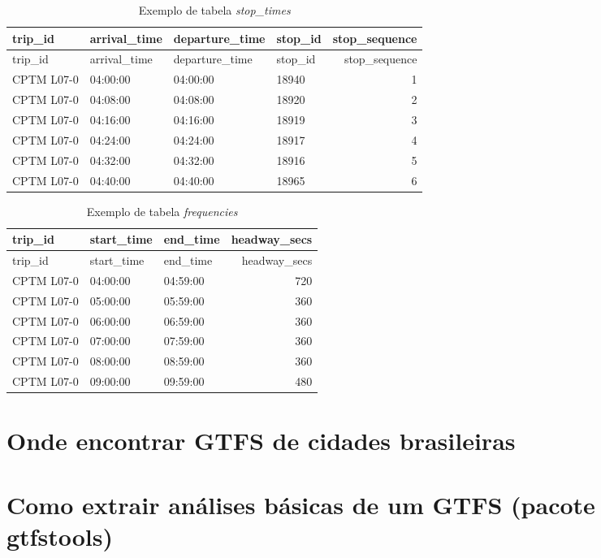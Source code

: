 \documentclass[
  letterpaper,
  DIV=11,
  numbers=noendperiod]{scrreprt}
\begin{document}
\hypertarget{tbl-stop_times}{}
\begin{longtable}[]{@{}llllr@{}}
\caption{\label{tbl-stop_times}Exemplo de tabela
\emph{stop\_times}}\tabularnewline
\toprule()
trip\_id & arrival\_time & departure\_time & stop\_id &
stop\_sequence \\
\midrule()
\endfirsthead
\toprule()
trip\_id & arrival\_time & departure\_time & stop\_id &
stop\_sequence \\
\midrule()
\endhead
CPTM L07-0 & 04:00:00 & 04:00:00 & 18940 & 1 \\
CPTM L07-0 & 04:08:00 & 04:08:00 & 18920 & 2 \\
CPTM L07-0 & 04:16:00 & 04:16:00 & 18919 & 3 \\
CPTM L07-0 & 04:24:00 & 04:24:00 & 18917 & 4 \\
CPTM L07-0 & 04:32:00 & 04:32:00 & 18916 & 5 \\
CPTM L07-0 & 04:40:00 & 04:40:00 & 18965 & 6 \\
\bottomrule()
\end{longtable}

\hypertarget{tbl-frequencies}{}
\begin{longtable}[]{@{}lllr@{}}
\caption{\label{tbl-frequencies}Exemplo de tabela
\emph{frequencies}}\tabularnewline
\toprule()
trip\_id & start\_time & end\_time & headway\_secs \\
\midrule()
\endfirsthead
\toprule()
trip\_id & start\_time & end\_time & headway\_secs \\
\midrule()
\endhead
CPTM L07-0 & 04:00:00 & 04:59:00 & 720 \\
CPTM L07-0 & 05:00:00 & 05:59:00 & 360 \\
CPTM L07-0 & 06:00:00 & 06:59:00 & 360 \\
CPTM L07-0 & 07:00:00 & 07:59:00 & 360 \\
CPTM L07-0 & 08:00:00 & 08:59:00 & 360 \\
CPTM L07-0 & 09:00:00 & 09:59:00 & 480 \\
\bottomrule()
\end{longtable}

\hypertarget{onde-encontrar-gtfs-de-cidades-brasileiras}{%
\section{Onde encontrar GTFS de cidades
brasileiras}\label{onde-encontrar-gtfs-de-cidades-brasileiras}}

\hypertarget{como-extrair-anuxe1lises-buxe1sicas-de-um-gtfs-pacote-gtfstools}{%
\section{Como extrair análises básicas de um GTFS (pacote
gtfstools)}\label{como-extrair-anuxe1lises-buxe1sicas-de-um-gtfs-pacote-gtfstools}}
\end{document}
